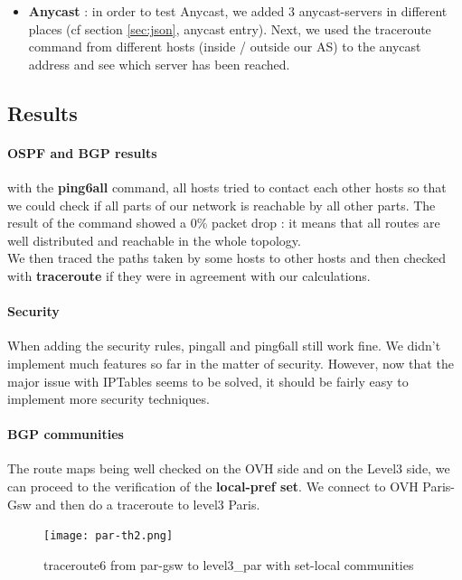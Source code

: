 \documentclass[letter, 9pt, conference]{ieeeconf}
\begin{document}
\begin{itemize}
\begin{itemize}
        
    \end{itemize}

    
    \item \textbf{Anycast} : in order to test Anycast, we added 3 anycast-servers in different places (cf section \ref{sec:json}, anycast entry). Next, we used the traceroute command from different hosts (inside / outside our AS) to the anycast address and see which server has been reached. 
\end{itemize}

\subsection{Results}

\paragraph{OSPF and BGP results} with the \textbf{ping6all} command, all hosts tried to contact each other hosts so that we could check if all parts of our network is reachable by all other parts. The result of the command showed a 0\% packet drop : it means that all routes are well distributed and reachable in the whole topology. \\

We then traced the paths taken by some hosts to other hosts and then checked with \textbf{traceroute} if they were in agreement with our calculations.

\paragraph{Security}
When adding the security rules, pingall and ping6all still work fine. We didn't implement much features so far in the matter of security. However, now that the major issue with IPTables seems to be solved, it should be fairly easy to implement more security techniques.


\paragraph{BGP communities}


The route maps being well checked on the OVH side and on the Level3 side, we can proceed to the verification of the \textbf{local-pref set}.
We connect to OVH Paris-Gsw and then do a traceroute to level3 Paris.
\begin{figure}[H]
    \centering
    \texttt{[image: par-th2.png]}
    \caption{traceroute6 from par-gsw to level3\_par with set-local communities}
    \label{fig:my_label}
\end{figure}
\end{document}

